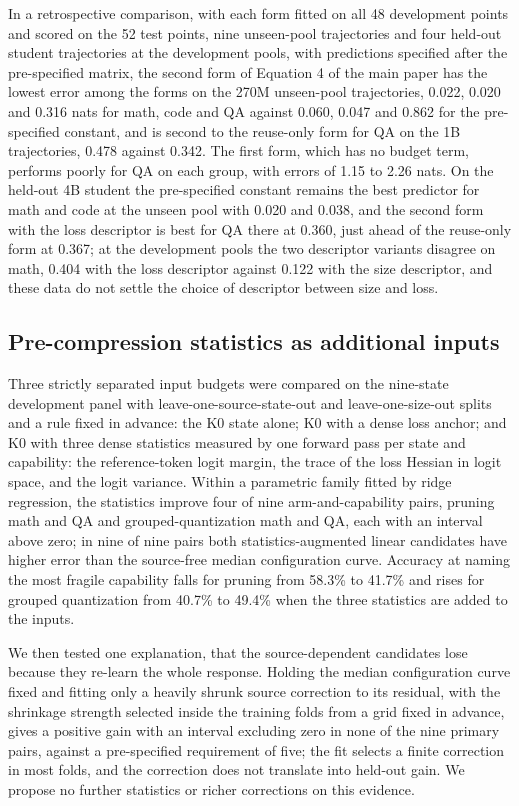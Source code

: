 In a retrospective comparison, with each form fitted on all 48
development points and scored on the 52 test points, nine unseen-pool trajectories and four held-out student trajectories at the development pools, with predictions specified after the pre-specified matrix, the second form of Equation 4 of the main paper has the lowest error among
the forms on the 270M unseen-pool trajectories, 0.022, 0.020 and 0.316 nats for math, code and QA against 0.060, 0.047 and 0.862 for the pre-specified constant, and is second to the reuse-only form for QA on the 1B
trajectories, 0.478 against 0.342. The first form, which has no budget
term, performs poorly for QA on each group, with errors of 1.15 to 2.26 nats. On the held-out 4B student the pre-specified
constant remains the best predictor for math and code at the unseen pool with 0.020 and 0.038, and the second form with the loss descriptor is best for QA there at 0.360, just ahead of the reuse-only form at 0.367; at the development pools the two descriptor variants disagree on math, 0.404 with the loss descriptor against 0.122 with the size descriptor, and
these data do not settle the choice of descriptor between size and loss.
\subsection{Pre-compression statistics as additional inputs}
\label{sec:app_inputs}

Three strictly separated input budgets were compared on the nine-state development panel with
leave-one-source-state-out and leave-one-size-out splits and a rule fixed in advance: the K0 state
alone; K0 with a dense loss anchor; and K0 with three dense statistics measured by one forward pass
per state and capability: the reference-token logit margin, the trace of the loss Hessian in logit space, and the logit variance. Within a parametric family fitted by ridge regression, the statistics
improve four of nine arm-and-capability pairs, pruning math and QA and grouped-quantization math and QA, each with an interval above zero; in nine of nine pairs both statistics-augmented linear candidates
have higher error than the source-free median configuration curve. Accuracy at naming the most
fragile capability falls for pruning from 58.3\% to 41.7\% and rises for grouped quantization from 40.7\% to 49.4\% when the three statistics are added to the inputs.

We then tested one explanation, that the source-dependent candidates lose because they re-learn the
whole response. Holding the median configuration curve fixed and fitting only a heavily shrunk source
correction to its residual, with the shrinkage strength selected inside the training folds from a grid
fixed in advance, gives a positive gain with an interval excluding zero in none of the nine primary
pairs, against a pre-specified requirement of five; the fit selects a finite correction in most folds,
and the correction does not translate into held-out gain. We propose no further statistics or richer
corrections on this evidence.


